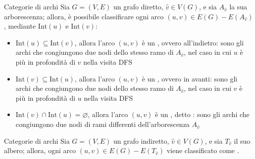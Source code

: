 \documentclass[a4paper, 12pt]{report}
\begin{document}
    \begin{frameddefn}{Categorie di archi}
        Sia $G= (V, E)$ un grafo diretto, $\hat v \in V(G)$, e sia $A_{\hat v}$ la sua arborescenza; allora, è possibile classificare ogni arco $(u, v) \in E(G) - E(A_{\hat v})$, mediante $\mathrm{Int}(u)$ e $\mathrm{Int}(v)$:
        \begin{itemize}
            \item $\mathrm{Int}(u) \subseteq \mathrm{Int}(v)$, allora l'arco $(u, v)$ è un , ovvero all'indietro: sono gli archi che congiungono due nodi dello stesso ramo di $A_{\hat v}$, nel caso in cui $u$ è più in profondità di $v$ nella visita DFS 
            \item $\mathrm{Int}(v) \subseteq \mathrm{Int}(u)$, allora l'arco $(u, v)$ è un , ovvero in avanti: sono gli archi che congiungono due nodi dello stesso ramo di $A_{\hat v}$, nel caso in cui $v$ è più in profondità di $u$ nella visita DFS
            \item $\mathrm{Int}(v) \cap \mathrm{Int}(u) = \varnothing$, allora l'arco $(u, v)$ è un , detto : sono gli archi che congiungono due nodi di rami differenti dell'arborescenza $A_{\hat v}$
        \end{itemize}
    \end{frameddefn}

    \begin{frameddefn}{Categorie di archi}
        Sia $G=(V, E)$ un grafo indiretto, $\hat v \in V(G)$, e sia $T_{\hat v}$ il suo albero; allora, ogni arco $(u, v) \in E(G) - E(T_{\hat v})$ viene classificato come .
    \end{frameddefn}
\end{document}
